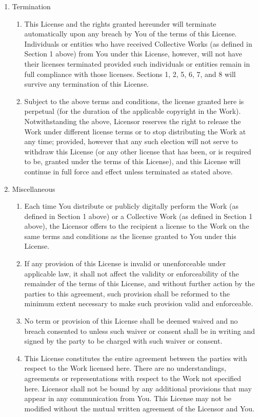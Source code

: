 \begin{enumerate}
  \item {Termination}
  \begin{enumerate} 
    \item {This License and the rights granted hereunder will terminate
    automatically upon any breach by You of the terms of this License.
    Individuals or entities who have received Collective Works (as defined in
    Section 1 above) from You under this License, however, will not have their
    licenses terminated provided such individuals or entities remain in full
    compliance with those licenses. Sections 1, 2, 5, 6, 7, and 8 will survive
    any termination of this License.}
    \item {Subject to the above terms and conditions, the license granted here
    is perpetual (for the duration of the applicable copyright in the Work).
    Notwithstanding the above, Licensor reserves the right to release the Work
    under different license terms or to stop distributing the Work at any time;
    provided, however that any such election will not serve to withdraw this
    License (or any other license that has been, or is required to be, granted
    under the terms of this License), and this License will continue in full
    force and effect unless terminated as stated above.}
  \end{enumerate}

  \item {Miscellaneous}
  \begin{enumerate}
    \item {Each time You distribute or publicly digitally perform the Work (as
    defined in Section 1 above) or a Collective Work (as defined in Section 1
    above), the Licensor offers to the recipient a license to the Work on the
    same terms and conditions as the license granted to You under this License.}
    \item {If any provision of this License is invalid or unenforceable under
    applicable law, it shall not affect the validity or enforceability of the
    remainder of the terms of this License, and without further action by the
    parties to this agreement, such provision shall be reformed to the minimum
    extent necessary to make such provision valid and enforceable.} 
    \item {No
    term or provision of this License shall be deemed waived and no breach
    consented to unless such waiver or consent shall be in writing and signed by
    the party to be charged with such waiver or consent.} 
    \item {This License
    constitutes the entire agreement between the parties with respect to the
    Work licensed here. There are no understandings, agreements or
    representations with respect to the Work not specified here. Licensor shall
    not be bound by any additional provisions that may appear in any
    communication from You. This License may not be modified without the mutual
    written agreement of the Licensor and You.}
  \end{enumerate}
\end{enumerate}
